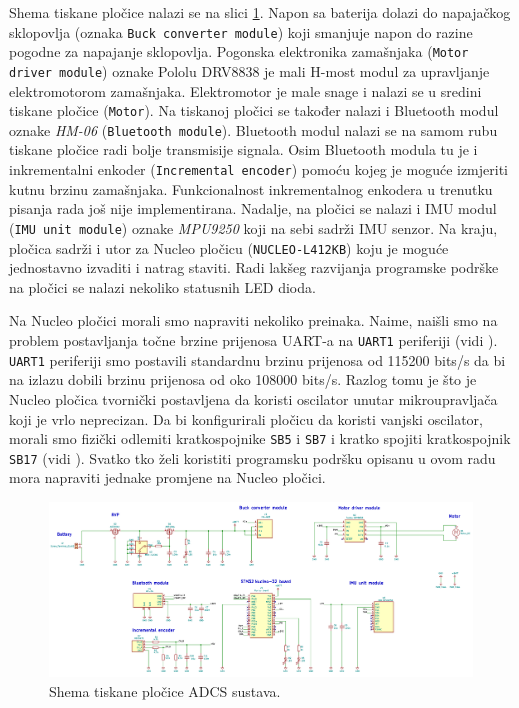 \documentclass[times, utf8, diplomski, numeric]{templates/template}
\begin{document}
{{{            Shema tiskane pločice nalazi se na slici \ref{fig:plocica_shema}. Napon sa baterija dolazi do napajačkog sklopovlja (oznaka \texttt{Buck converter module}) koji smanjuje napon do razine pogodne za napajanje sklopovlja. Pogonska elektronika zamašnjaka (\texttt{Motor driver module}) oznake Pololu DRV8838 \cite{pololu} je mali H-most modul za upravljanje elektromotorom zamašnjaka. Elektromotor je male snage i nalazi se u sredini tiskane pločice (\texttt{Motor}). Na tiskanoj pločici se također nalazi i Bluetooth modul oznake \emph{HM-06} (\texttt{Bluetooth module}). Bluetooth modul nalazi se na samom rubu tiskane pločice radi bolje transmisije signala. Osim Bluetooth modula tu je i inkrementalni enkoder (\texttt{Incremental encoder}) pomoću kojeg je moguće izmjeriti kutnu brzinu zamašnjaka. Funkcionalnost inkrementalnog enkodera u trenutku pisanja rada još nije implementirana. Nadalje, na pločici se nalazi i IMU modul (\texttt{IMU unit module}) oznake \emph{MPU9250} koji na sebi sadrži IMU  senzor. Na kraju, pločica sadrži i utor za Nucleo pločicu (\texttt{NUCLEO-L412KB}) \cite{nucleo_um} koju je moguće jednostavno izvaditi i natrag staviti. Radi lakšeg razvijanja programske podrške na pločici se nalazi nekoliko statusnih LED dioda.

            Na Nucleo pločici morali smo napraviti nekoliko preinaka. Naime, naišli smo na problem postavljanja točne brzine prijenosa UART-a  na \texttt{UART1} periferiji (vidi \cite{uc_um}). \texttt{UART1} periferiji smo postavili standardnu brzinu prijenosa od 115200 bits/s da bi na izlazu dobili brzinu prijenosa od oko 108000 bits/s. Razlog tomu je što je Nucleo pločica tvornički postavljena da koristi oscilator unutar mikroupravljača koji je vrlo neprecizan. Da bi konfigurirali pločicu da koristi vanjski oscilator, morali smo fizički odlemiti kratkospojnike \texttt{SB5} i \texttt{SB7} i kratko spojiti kratkospojnik \texttt{SB17} (vidi \cite{nucleo_um}). Svatko tko želi koristiti programsku podršku opisanu u ovom radu mora napraviti jednake promjene na Nucleo pločici.

            \begin{landscape}
                \begin{figure}[h!]
                \centering
                \includegraphics[width=1.8\textwidth]{images/plocica_shema.png}
                \caption{Shema tiskane pločice ADCS sustava.}
                \label{fig:plocica_shema}
                \end{figure}
            \end{landscape}
        }

}}
\end{document}
